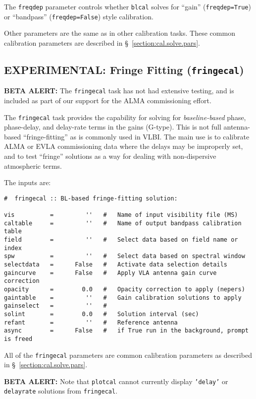 The {\tt freqdep} parameter controls whether {\tt blcal} solves for 
``gain'' ({\tt freqdep=True}) or ``bandpass'' ({\tt freqdep=False})
style calibration.

Other parameters are the same as in other calibration tasks.
These common calibration parameters are described in
\S~\ref{section:cal.solve.pars}.

\subsection{EXPERIMENTAL: Fringe Fitting ({\tt fringecal})}
\label{section:cal.solve.fringe}

{\bf BETA ALERT:} The {\tt fringecal} task has not had extensive testing,
and is included as part of our support for the ALMA commissioning
effort.

The {\tt fringecal} task provides the capability for solving for {\em
baseline-based} phase, phase-delay, and delay-rate terms in the gains
(G-type).  This is not full antenna-based ``fringe-fitting'' as is
commonly used in VLBI.  The main use is to calibrate ALMA or EVLA
commissioning data where the delays may be improperly set, and to test
``fringe'' solutions as a way for dealing with non-dispersive
atmospheric terms.  

The inputs are:
\small
\begin{verbatim}
#  fringecal :: BL-based fringe-fitting solution: 

vis          =         ''   #   Name of input visibility file (MS)
caltable     =         ''   #   Name of output bandpass calibration table
field        =         ''   #   Select data based on field name or index
spw          =         ''   #   Select data based on spectral window
selectdata   =      False   #   Activate data selection details
gaincurve    =      False   #   Apply VLA antenna gain curve correction
opacity      =        0.0   #   Opacity correction to apply (nepers)
gaintable    =         ''   #   Gain calibration solutions to apply
gainselect   =         ''   #   
solint       =        0.0   #   Solution interval (sec)
refant       =         ''   #   Reference antenna
async        =      False   #   if True run in the background, prompt is freed
\end{verbatim}
\normalsize
All of the {\tt fringecal} parameters are common calibration
parameters as described in \S~\ref{section:cal.solve.pars}.

{\bf BETA ALERT:} Note that {\tt plotcal} cannot currently display
{\tt 'delay'} or {\tt delayrate} solutions from {\tt fringecal}.

